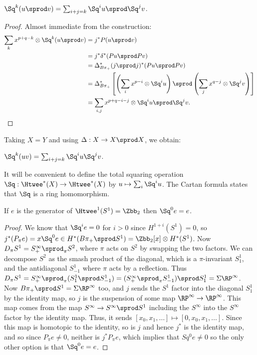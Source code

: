 \begin{cor}
$\Sq^k(u \sprod v) = \sum_{i+j = k} \Sq^i u \sprod \Sq^j v$.
\end{cor}
%
\begin{proof}
Almost immediate from the construction:
\begin{align*}
\sum_k x^{p+q-k} \otimes \Sq^k(u \sprod v) & = j^* P(u \sprod v) \\
& = j^* \delta^*(Pu \sprod Pv) \\
& = \Delta_{B \pi_+}^* (j \sprod j)^*(Pu \sprod Pv) \\
& = \Delta_{B \pi_+}^*\left[\left(\sum_i x^{p-i} \otimes \Sq^i u\right) \sprod \left(\sum_j x^{q-j} \otimes \Sq^j v\right)\right] \\ %
& = \sum_{i, j}x^{p+q-i-j} \otimes \Sq^i u \sprod \Sq^j v.\qedhere
\end{align*}
\end{proof}
\noindent
Taking $X = Y$ and using $\Delta: X \to X \sprod X$, we obtain:
\begin{cor}
$\Sq^k(uv) = \sum_{i+j=k} \Sq^i u \Sq^j v$.
\end{cor}
\noindent It will be convenient to define the total squaring operation $\Sq:\Htwee^*(X)\to\Htwee^*(X)$ by $ u\mapsto\sum_i \Sq^i u$. The Cartan formula states that $\Sq$ is a ring homomorphism.

\begin{lem}
If $e$ is the generator of $\Htwee^1 (S^1) = \Zbb_2$ then $\Sq^0 e = e$.
\end{lem}

\begin{proof}
We know that $\Sq^i e = 0$ for $i>0$ since $H^{1+i}(S^1)=0$, so $j^*(P_{\pi}e)=x\Sq^0 e \in H^*(B\pi_+ \sprod S^1)=\Zbb_2[x]\otimes H^*(S^1)$.  Now $D_{\pi}S^1 = S^{\infty}_+\sprod_{\pi} S^2$, where $\pi$ acts on $S^2$ by swapping the two factors.  We can decompose $S^2$ as the smash product of the diagonal, which is a $\pi$-invariant $S^1_1$, and the antidiagonal $S^1_{-1}$ where $\pi$ acts by a reflection.  Thus $D_{\pi} S^1 = S^{\infty}_+ \sprod_\pi (S^1_1 \sprod S^1_{-1}) = (S^{\infty}_+\sprod_{\pi} S^1_{-1}) \sprod S^1_1 = \Sigma \RP^{\infty}$.  Now $B\pi_+\sprod S^1=\Sigma \RP^{\infty}$ too, and $j$ sends the $S^1$ factor into the diagonal $S^1_1$ by the identity map, so $j$ is the suspension of some map $\RP^{\infty}\to\RP^{\infty}$.  This map comes from the map $S^{\infty}\to S^{\infty}\sprod S^1$ including the $S^{\infty}$ into the $S^{\infty}$ factor by the identity map.  Thus, it sends $[x_0,x_1,\ldots]\mapsto [0,x_0,x_1,\ldots]$.  Since this map is homotopic to the identity, so is $j$ and hence $j^*$ is the identity map, and so since $P_\pi e\neq 0$, neither is $j^*P_{\pi}e$, which implies that $Sq^0e\neq 0$ so the only other option is that $\Sq^0 e = e$.
\end{proof}

